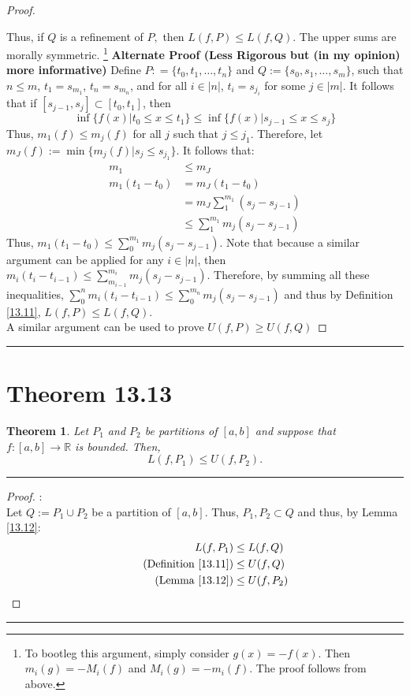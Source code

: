 \documentclass[openany, amssymb, psamsfonts]{amsart}
\newcommand{\bbR}{\mathbb{R}}
\newtheorem{thm}{Theorem}[section]
\theoremstyle{definition}
\numberwithin{equation}{section}
\begin{document}
\begin{proof}
\begin{enumerate}
\end{enumerate}
Thus, if $Q$ is a refinement of $P,$ then $L(f,P)\leq L(f,Q).$ The upper sums are morally symmetric. \footnote{To bootleg this argument, simply consider $g(x) = -f(x)$. Then $m_i(g) = -M_i(f)$ and $M_i(g) = -m_i(f).$ The proof follows from above.}\newline\newline
\textbf{Alternate Proof (Less Rigorous but (in my opinion) more informative)}
    Define $P: = \{t_0, t_1, \dots , t_n\}$ and $Q:= \{s_0, s_1, \dots, s_m\}$, such that $n\leq m$, $t_1 = s_{m_1}$, $t_n = s_{m_n}$, and for all $i\in |n|$, $t_i = s_{j_i}$ for some $j\in |m|$. It follows that if $[s_{j-1}, s_{j}]\subset [t_{0}, t_1]$, then \[\inf\{f(x) | t_{0}\leq x \leq t_1\} \leq \inf\{f(x) | s_{j-1}\leq x \leq s_j\}\] Thus, $m_1(f)\leq m_j(f)$ for all $j$ such that $j\leq j_{1}$. Therefore, let $m_J(f) := \min\{m_j(f) | s_j \leq s_{j_1}\}$. It follows that:
    \begin{align*}
        m_1 &\leq m_J\\
        m_1(t_1 - t_0)  &= m_J(t_1 - t_0)\\
         &=  m_J\sum_{1}^{m_1}(s_j-s_{j-1})\\
         &\leq \sum_{1}^{m_1}m_j(s_j-s_{j-1})
    \end{align*}
    Thus, $m_1(t_1 - t_0) \leq \sum_{0}^{m_1}m_j(s_j-s_{j-1})$. Note that because a similar argument can be applied for any $i\in |n|$, then $m_i(t_i-t_{i-1})\leq \sum_{m_{i-1}}^{m_i}m_j(s_j-s_{j-1})$. Therefore, by summing all these inequalities, $\sum_{0}^{n}m_i(t_i - t_{i-1}) \leq \sum_{0}^{m_n}m_j(s_j-s_{j-1})$ and thus by Definition \ref{13.11}, $L(f,P)\leq L(f,Q)$.\\
    A similar argument can be used to prove $U(f,P)\geq U(f,Q)$
\end{proof}\vspace{4pt}     \hrule   \vspace{4pt} 

\section*{Theorem 13.13}
\begin{thm}
\label{13.13}
	Let $P_1$ and $P_2$ be partitions of $[a, b]$ and suppose that $f\colon [a, b] \to \bbR$ is bounded. Then,
	\[
		L(f, P_1) \leq U(f, P_2).
	\]
\end{thm}
\vspace{4pt}     \hrule   \vspace{4pt} \begin{proof}:\\
Let $Q := P_1 \cup P_2$ be a partition of $[a,b]$. Thus, $P_1, P_2 \subset Q$ and thus, by Lemma \ref{13.12}:
\begin{align*}
    L(f,P_1) &\leq L(f,Q)\\
\tag{Definition \ref{13.11}}             &\leq U(f,Q)\\
\tag{Lemma \ref{13.12}}             &\leq U(f,P_2)
\end{align*}
\end{proof}\vspace{4pt}     \hrule   \vspace{4pt}
\end{document}
